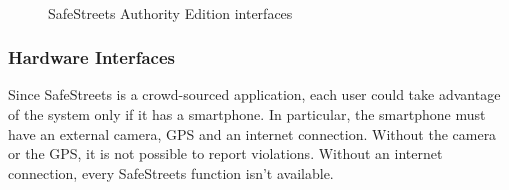 \documentclass{article}
\begin{document}
		
			\begin{figure}
			\centering
			 \quad \quad
			 \\			
			\caption{SafeStreets Authority Edition interfaces}
			\label{fig:AE_interfaces2}
		\end{figure}

			
			
			\subsubsection{Hardware Interfaces} \label{hardware_interfaces}
				Since SafeStreets is a crowd-sourced application, each user could take advantage of the system only if it has a smartphone. In particular, the smartphone must have an external camera, GPS and an internet connection.
				Without the camera or the GPS, it is not possible to report violations. Without an internet connection, every SafeStreets function isn't available.
				
\end{document}
